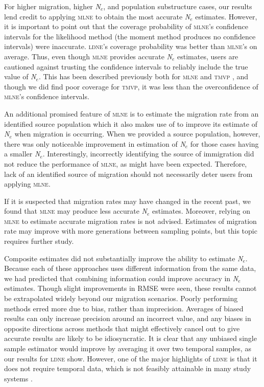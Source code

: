For higher migration, higher \emph{N}$_e$, and population substructure cases, our results 
lend credit to applying \textsc{mlne} to obtain the most accurate \emph{N}$_e$ estimates. However, 
it is important to point out that the coverage probability of \textsc{mlne}'s confidence intervals 
for the likelihood method (the moment method produces no confidence
intervals) were inaccurate. \textsc{ldne}'s coverage probability was better than \textsc{mlne}'s 
on average. Thus, even though \textsc{mlne} provides accurate \emph{N}$_e$ estimates, users are 
cautioned against trusting the confidence intervals to reliably include the true value of \emph{N}$_e$. 
This has been described previously both for \textsc{mlne} and \textsc{tmvp} \citep{Tallmon:2004}, and 
though we did find poor coverage for \textsc{tmvp}, it was less than the overconfidence of 
\textsc{mlne}'s confidence intervals.

An additional promised feature of \textsc{mlne} is to estimate the migration rate from an 
identified source population which it also makes use of to improve its estimate of \emph{N}$_e$ 
when migration is occurring. When we provided a source population, however, there was only noticeable 
improvement in estimation of \emph{N}$_e$ for those cases having a smaller \emph{N}$_e$. 
Interestingly, incorrectly identifying the source of immigration did not reduce the performance of 
\textsc{mlne}, as might have been expected. Therefore, lack of an identified source of migration 
should not necessarily deter users from applying \textsc{mlne}.

If it is suspected that migration rates may have changed in the recent past, we found that 
\textsc{mlne} may produce less accurate \emph{N}$_e$ estimates. Moreover, relying on \textsc{mlne} 
to estimate accurate migration rates is not advised. Estimates of migration rate may improve with 
more generations between sampling points, but this topic requires further study.

Composite estimates did not substantially improve the ability to estimate \emph{N}$_e$. 
Because each of these approaches uses different information from the same data, we had predicted 
that combining information could improve accuracy in \emph{N}$_e$ estimates. Though slight 
improvements in RMSE were seen, these results cannot be extrapolated widely beyond our migration 
scenarios. Poorly performing methods erred more due to bias, rather than imprecision. Averages 
of biased results can only increase precision around an incorrect value, and any biases in 
opposite directions across methods that might effectively cancel out to give accurate results 
are likely to be idiosyncratic. It is clear that any unbiased single sample estimator would 
improve by averaging it over two temporal samples, as our results for \textsc{ldne} show. 
However, one of the major highlights of \textsc{ldne} is that it does not require temporal 
data, which is not feasibly attainable in many study systems \citep{Waples:2008}.


